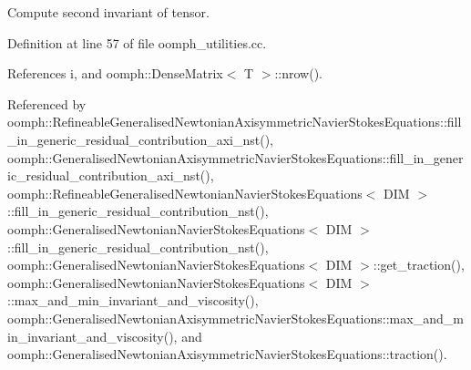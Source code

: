 Compute second invariant of tensor. 



Definition at line 57 of file oomph\+\_\+utilities.\+cc.



References i, and oomph\+::\+Dense\+Matrix$<$ T $>$\+::nrow().



Referenced by oomph\+::\+Refineable\+Generalised\+Newtonian\+Axisymmetric\+Navier\+Stokes\+Equations\+::fill\+\_\+in\+\_\+generic\+\_\+residual\+\_\+contribution\+\_\+axi\+\_\+nst(), oomph\+::\+Generalised\+Newtonian\+Axisymmetric\+Navier\+Stokes\+Equations\+::fill\+\_\+in\+\_\+generic\+\_\+residual\+\_\+contribution\+\_\+axi\+\_\+nst(), oomph\+::\+Refineable\+Generalised\+Newtonian\+Navier\+Stokes\+Equations$<$ D\+I\+M $>$\+::fill\+\_\+in\+\_\+generic\+\_\+residual\+\_\+contribution\+\_\+nst(), oomph\+::\+Generalised\+Newtonian\+Navier\+Stokes\+Equations$<$ D\+I\+M $>$\+::fill\+\_\+in\+\_\+generic\+\_\+residual\+\_\+contribution\+\_\+nst(), oomph\+::\+Generalised\+Newtonian\+Navier\+Stokes\+Equations$<$ D\+I\+M $>$\+::get\+\_\+traction(), oomph\+::\+Generalised\+Newtonian\+Navier\+Stokes\+Equations$<$ D\+I\+M $>$\+::max\+\_\+and\+\_\+min\+\_\+invariant\+\_\+and\+\_\+viscosity(), oomph\+::\+Generalised\+Newtonian\+Axisymmetric\+Navier\+Stokes\+Equations\+::max\+\_\+and\+\_\+min\+\_\+invariant\+\_\+and\+\_\+viscosity(), and oomph\+::\+Generalised\+Newtonian\+Axisymmetric\+Navier\+Stokes\+Equations\+::traction().

